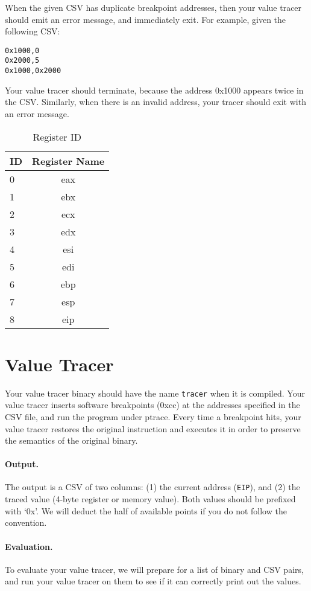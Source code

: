 \documentclass[a4paper, 11pt]{article}
\theoremstyle{definition}
\begin{document}
{When the given CSV has duplicate breakpoint addresses, then your value
tracer should emit an error message, and immediately exit. For
example, given the following CSV:
\begin{verbatim}
0x1000,0
0x2000,5
0x1000,0x2000
\end{verbatim}
%
Your value tracer should terminate, because the address 0x1000 appears
twice in the CSV. Similarly, when there is an invalid address, your
tracer should exit with an error message.

\begin{table}[h]
  \centering
  \begin{tabular}{lc}
    ID & Register Name \\\hline
    0 & eax \\
    1 & ebx \\
    2 & ecx \\
    3 & edx \\
    4 & esi \\
    5 & edi \\
    6 & ebp \\
    7 & esp \\
    8 & eip \\\hline
  \end{tabular}
  \caption{Register ID}
  \label{tab:regid}
\end{table}

\section{Value Tracer}

Your value tracer binary should have the name \texttt{tracer} when it
is compiled. Your value tracer inserts software breakpoints (0xcc) at
the addresses specified in the CSV file, and run the program under
ptrace. Every time a breakpoint hits, your value tracer restores the
original instruction and executes it in order to preserve the
semantics of the original binary.

\paragraph{Output.} The output is a CSV of two columns: (1) the
current address (\texttt{EIP}), and (2) the traced value (4-byte
register or memory value). Both values should be prefixed with `0x'.
We will deduct the half of available points if you do not follow the
convention.

\paragraph{Evaluation.} To evaluate your value tracer, we will prepare
for a list of binary and CSV pairs, and run your value tracer on them
to see if it can correctly print out the values.

}
\end{document}
